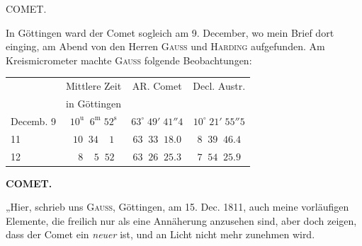 \par{}\bigskip
\hypertarget{native-348-lower}{}\label{native-348-lower}
\begin{center}
\large COMET.
\end{center}

\par\indent In Göttingen ward der Comet sogleich am 9. December, wo mein Brief dort einging, am Abend von den Herren \textsc{Gauss} und \textsc{Harding} aufgefunden. Am Kreismicrometer machte \textsc{Gauss} folgende Beobachtungen:

\begin{center}
\fontsize{10}{12}\selectfont\setlength{\tabcolsep}{4pt}\renewcommand{\arraystretch}{1.15}\begin{tabular}{l|c|c|c}
 & Mittlere Zeit & AR. Comet & Decl. Austr. \\
 & in Göttingen & & \\ \hline
Decemb. 9 & $10^{\mathrm u}\;\;6^{\mathrm m}\;52^{\mathrm s}$ & $63^\circ\;49'\;41''4$ & $10^\circ\;21'\;55''5$ \\
11 & $10\;\;34\;\;\;\;1$ & $63\;\;33\;\;18.0$ & $8\;\;39\;\;46.4$ \\
12 & $\;\;8\;\;\;\;5\;\;52$ & $63\;\;26\;\;25.3$ & $7\;\;54\;\;25.9$ \\
\end{tabular}
\end{center}

\clearpage
\endgroup
\clearpage
\begingroup
\pagestyle{empty}
\thispagestyle{empty}
\noindent{}%
%
\parbox[t]{\dimexpr\linewidth-24mm\relax}{\centering\footnotesize\bfseries COMET.\par}%
\makebox[12mm][r]{}\par\nobreak\medskip
\par\indent „Hier, schrieb uns \textsc{Gauss}, Göttingen, am 15. Dec. 1811, auch meine vorläufigen Elemente, die freilich nur als eine Annäherung anzusehen sind, aber doch zeigen, dass der Comet ein \emph{neuer} ist, und an Licht nicht mehr zunehmen wird.

